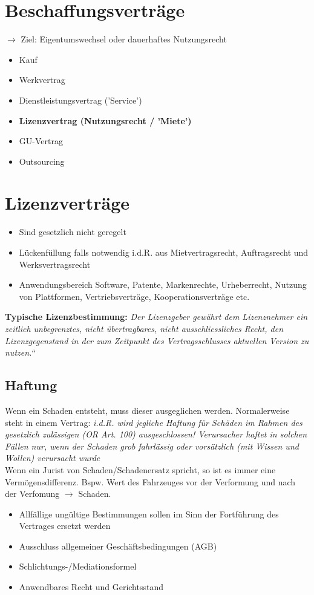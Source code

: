 \documentclass{report}
\theoremstyle{definition}
\theoremstyle{example}
\begin{document}
\section{Beschaffungsverträge}
$\rightarrow$ Ziel: Eigentumswechsel oder dauerhaftes Nutzungsrecht
\begin{itemize}
   \item Kauf 
   \item Werkvertrag
   \item Dienstleistungsvertrag ('Service')
   \item \textbf{Lizenzvertrag (Nutzungsrecht / 'Miete')}
   \item GU-Vertrag
   \item Outsourcing
\end{itemize}

\section{Lizenzverträge}
\begin{itemize}
   \item Sind gesetzlich nicht geregelt
   \item Lückenfüllung falls notwendig i.d.R. aus Mietvertragsrecht, Auftragsrecht und Werksvertragsrecht
   \item Anwendungsbereich
   \subitem Software, Patente, Markenrechte, Urheberrecht, Nutzung von Plattformen, Vertriebsverträge, Kooperationsverträge etc. 
\end{itemize}

\textbf{Typische Lizenzbestimmung:} \textit{Der Lizenzgeber gewährt dem Lizenznehmer ein zeitlich
unbegrenztes, nicht übertragbares, nicht ausschliessliches
Recht, den Lizenzgegenstand in der zum Zeitpunkt des
Vertragsschlusses aktuellen Version zu nutzen.“}\\

\subsection{Haftung}
Wenn ein Schaden entsteht, muss dieser ausgeglichen werden. Normalerweise steht in einem Vertrag:
\textit{i.d.R. wird jegliche Haftung für Schäden im Rahmen des gesetzlich zulässigen (OR Art. 100) ausgeschlossen! Verursacher haftet in solchen Fällen nur, wenn der Schaden grob fahrlässig oder vorsätzlich (mit Wissen und Wollen) verursacht wurde}\\

Wenn ein Jurist von Schaden/Schadenersatz spricht, so ist es immer eine Vermögensdifferenz. Bspw. Wert des Fahrzeuges vor der Verformung und nach der Verfomung $\rightarrow$ Schaden.
\begin{itemize}
   \item Allfällige ungültige Bestimmungen sollen im Sinn der Fortführung des Vertrages ersetzt werden
   \item Ausschluss allgemeiner Geschäftsbedingungen (AGB)
   \item Schlichtungs-/Mediationsformel
   \item Anwendbares Recht und Gerichtsstand
\end{itemize}
\end{document}
